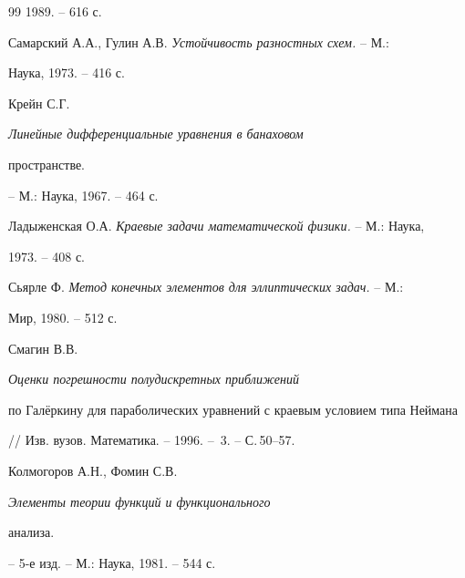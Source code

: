 \begin{thebibliography}{99}
1989. -- 616 с.




Самарский А.А., Гулин А.В. {\it Устойчивость разностных схем.} -- М.:


Наука, 1973. -- 416 с.




Крейн С.Г. {\it Линейные дифференциальные уравнения в банаховом


пространстве.} -- М.: Наука, 1967. -- 464 с.




Ладыженская О.А. {\it Краевые задачи математической физики.} -- М.: Наука,


1973. -- 408 с.




Сьярле Ф. {\it Метод конечных элементов для эллиптических задач.} -- М.:


Мир, 1980. -- 512 с.




Смагин В.В. {\it Оценки погрешности полудискретных приближений


по Гал\"еркину для параболических уравнений с краевым условием типа Неймана}


// Изв. вузов. Математика. -- 1996. -- \No\,3. -- С.\,50--57.




Колмогоров А.Н., Фомин С.В. {\it Элементы теории функций и функционального


анализа.} -- 5-е изд. -- М.: Наука, 1981. -- 544 с.





\end{thebibliography}





\vskip 2cm












\label{end}





